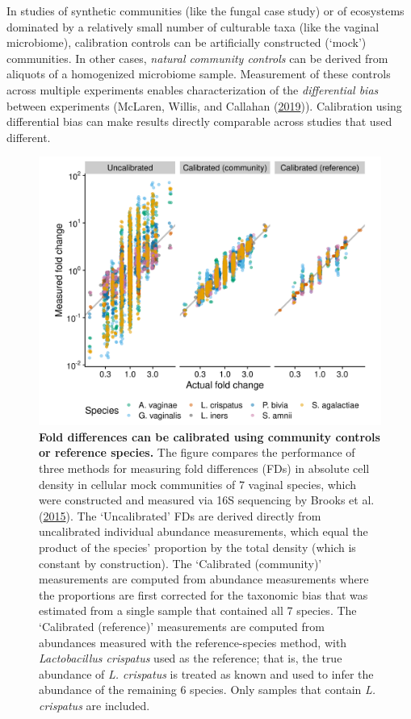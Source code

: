 \documentclass[
]{article}
\begin{document}
In studies of synthetic communities (like the fungal case study) or of ecosystems dominated by a relatively small number of culturable taxa (like the vaginal microbiome), calibration controls can be artificially constructed (`mock') communities.
In other cases, \emph{natural community controls} can be derived from aliquots of a homogenized microbiome sample.
Measurement of these controls across multiple experiments enables characterization of the \emph{differential bias} between experiments (McLaren, Willis, and Callahan (\protect\hyperlink{ref-mclaren2019cons}{2019})).
Calibration using differential bias can make results directly comparable across studies that used different.

\begin{figure}
\includegraphics[width=1\linewidth]{notebook/_posts/2021-10-25-brooks2015thet-calibration/brooks2015thet-calibration_files/figure-html5/brooks2015thet_fc_calibration-1} \caption{\textbf{Fold differences can be calibrated using community controls or reference species.} The figure compares the performance of three methods for measuring fold differences (FDs) in absolute cell density in cellular mock communities of 7 vaginal species, which were constructed and measured via 16S sequencing by Brooks et al. (\protect\hyperlink{ref-brooks2015thet}{2015}). The `Uncalibrated' FDs are derived directly from uncalibrated individual abundance measurements, which equal the product of the species' proportion by the total density (which is constant by construction). The `Calibrated (community)' measurements are computed from abundance measurements where the proportions are first corrected for the taxonomic bias that was estimated from a single sample that contained all 7 species. The `Calibrated (reference)' measurements are computed from abundances measured with the reference-species method, with \emph{Lactobacillus crispatus} used as the reference; that is, the true abundance of \emph{L. crispatus} is treated as known and used to infer the abundance of the remaining 6 species. Only samples that contain \emph{L. crispatus} are included.}\label{fig:calibration-example}
\end{figure}
\end{document}
